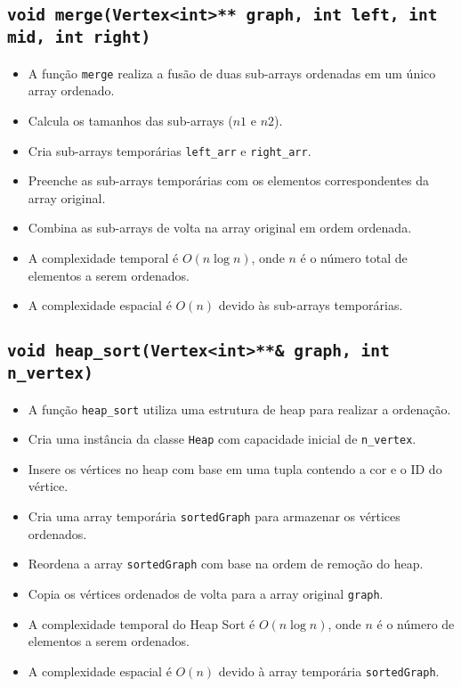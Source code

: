 \documentclass{article}
\begin{document}
\subsection{\texttt{void merge(Vertex<int>** graph, int left, int mid, int right)}}
\begin{itemize}
    \item A função \texttt{merge} realiza a fusão de duas sub-arrays ordenadas em um único array ordenado.
    \item Calcula os tamanhos das sub-arrays (\(n1\) e \(n2\)).
    \item Cria sub-arrays temporárias \texttt{left\_arr} e \texttt{right\_arr}.
    \item Preenche as sub-arrays temporárias com os elementos correspondentes da array original.
    \item Combina as sub-arrays de volta na array original em ordem ordenada.
    \item A complexidade temporal é \(O(n \log n)\), onde \(n\) é o número total de elementos a serem ordenados.
    \item A complexidade espacial é \(O(n)\) devido às sub-arrays temporárias.
\end{itemize}



\subsection{\texttt{void heap\_sort(Vertex<int>**\& graph, int n\_vertex)}}
\begin{itemize}
    \item A função \texttt{heap\_sort} utiliza uma estrutura de heap para realizar a ordenação.
    \item Cria uma instância da classe \texttt{Heap} com capacidade inicial de \texttt{n\_vertex}.
    \item Insere os vértices no heap com base em uma tupla contendo a cor e o ID do vértice.
    \item Cria uma array temporária \texttt{sortedGraph} para armazenar os vértices ordenados.
    \item Reordena a array \texttt{sortedGraph} com base na ordem de remoção do heap.
    \item Copia os vértices ordenados de volta para a array original \texttt{graph}.
    \item A complexidade temporal do Heap Sort é \(O(n \log n)\), onde \(n\) é o número de elementos a serem ordenados.
    \item A complexidade espacial é \(O(n)\) devido à array temporária \texttt{sortedGraph}.
\end{itemize}
\end{document}
